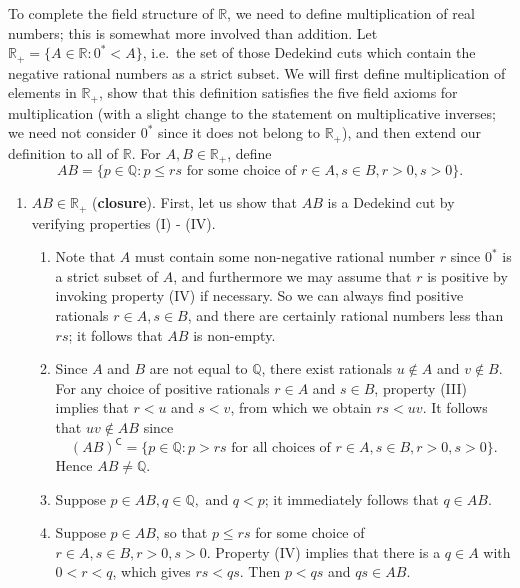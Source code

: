 \documentclass[12pt]{article}
\theoremstyle{definition}
\begin{document}
To complete the field structure of \( \mathbb{R} \), we need to define multiplication of real numbers; this is somewhat more involved than addition. Let \( \mathbb{R}_+ = \{ A \in \mathbb{R} : 0^* < A \} \), i.e.\ the set of those Dedekind cuts which contain the negative rational numbers as a strict subset. We will first define multiplication of elements in \( \mathbb{R}_+ \), show that this definition satisfies the five field axioms for multiplication (with a slight change to the statement on multiplicative inverses; we need not consider \( 0^* \) since it does not belong to \( \mathbb{R}_+ \)), and then extend our definition to all of \( \mathbb{R} \). For \( A, B \in \mathbb{R}_+ \), define
\[
    AB = \{ p \in \mathbb{Q} : p \leq rs \text{ for some choice of } r \in A, s \in B, r > 0, s > 0 \}.
\]
\begin{enumerate}[label = (M\arabic*)]
    \item \( AB \in \mathbb{R}_+ \) (\textbf{closure}). First, let us show that \( AB \) is a Dedekind cut by verifying properties (I) - (IV).
    
    \begin{enumerate}[label = (\Roman*)]
        \item Note that \( A \) must contain some non-negative rational number \( r \) since \( 0^* \) is a strict subset of \( A \), and furthermore we may assume that \( r \) is positive by invoking property (IV) if necessary. So we can always find positive rationals \( r \in A, s \in B \), and there are certainly rational numbers less than \( rs \); it follows that \( AB \) is non-empty.
        
        \item Since \( A \) and \( B \) are not equal to \( \mathbb{Q} \), there exist rationals \( u \not\in A \) and \( v \not\in B \). For any choice of positive rationals \( r \in A \) and \( s \in B \), property (III) implies that \( r < u \) and \( s < v \), from which we obtain \( rs < uv \). It follows that \( uv \not\in AB \) since
        \[
            (AB)^{\mathsf{C}} = \{ p \in \mathbb{Q} : p > rs \text{ for all choices of } r \in A, s \in B, r > 0, s > 0 \}.
        \]
        Hence \( AB \neq \mathbb{Q} \).
        
        \item Suppose \( p \in AB, q \in \mathbb{Q}, \) and \( q < p \); it immediately follows that \( q \in AB \).
        
        \item Suppose \( p \in AB \), so that \( p \leq rs \) for some choice of \( r \in A, s \in B, r > 0, s > 0 \). Property (IV) implies that there is a \( q \in A \) with \( 0 < r < q \), which gives \( rs < qs \). Then \( p < qs \) and \( qs \in AB \).
    \end{enumerate}
    

\end{enumerate}
\end{document}
